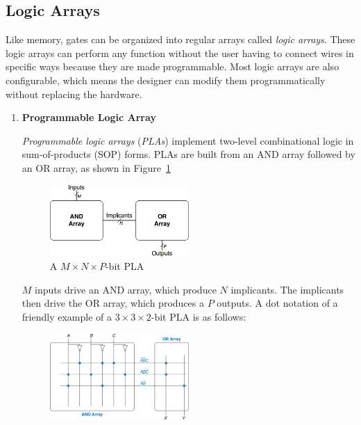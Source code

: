 \documentclass[12pt]{article}
\numberwithin{figure}{subsection}
\numberwithin{table}{subsection}
\numberwithin{equation}{subsection}
\begin{document}
\subsection{Logic Arrays}

Like memory, gates can be organized into regular arrays called \textit{logic arrays}. These logic arrays can perform any function without the user having to connect wires in specific ways because they are made programmable. Most logic arrays are also configurable, which means the designer can modify them programmatically without replacing the hardware.

\begin{enumerate}
  \item \textbf{Programmable Logic Array}

  \textit{Programmable logic arrays} (\textit{PLAs}) implement two-level combinational logic in sum-of-products (SOP) forms. PLAs are built from an AND array followed by an OR array, as shown in Figure~\ref{fig:mnp_bit_pla}

  \begin{figure}[ht]
    \centering
    \includegraphics[width=0.5\textwidth]{mnp_bit_pla.png}
    \caption{A $M \times N \times P$-bit PLA}
    \label{fig:mnp_bit_pla}
  \end{figure}

  $M$ inputs drive an AND array, which produce $N$ implicants. The implicants then drive the OR array, which produces a $P$ outputs. A dot notation of a friendly example of a $3 \times 3 \times 2$-bit PLA is as follows:

  \newpage

  \begin{figure}[ht]
    \centering
    \includegraphics[width=0.5\textwidth]{3x3x2_pla.png}
  \end{figure}


\end{enumerate}
\end{document}
